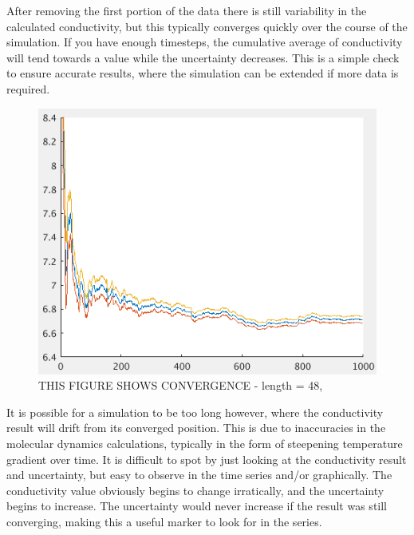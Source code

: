 After removing the first portion of the data there is still variability in the calculated conductivity, but this typically converges quickly over the course of the simulation. If you have enough timesteps, the cumulative average of conductivity will tend towards a value while the uncertainty decreases. This is a simple check to ensure accurate results, where the simulation can be extended if more data is required.

\begin{figure}[h!]
\includegraphics[width=\linewidth]{Figures/direct_raw_conv_4000_2x2.png}
\caption[direct conv]{THIS FIGURE SHOWS CONVERGENCE - length = 48, }
\label{fig:direct_conv}
\end{figure}

It is possible for a simulation to be too long however, where the conductivity result will drift from its converged position. This is due to inaccuracies in the molecular dynamics calculations, typically in the form of steepening temperature gradient over time. It is difficult to spot by just looking at the conductivity result and uncertainty, but easy to observe in the time series and/or graphically. The conductivity value obviously begins to change irratically, and the uncertainty begins to increase. The uncertainty would never increase if the result was still converging, making this a useful marker to look for in the series.

